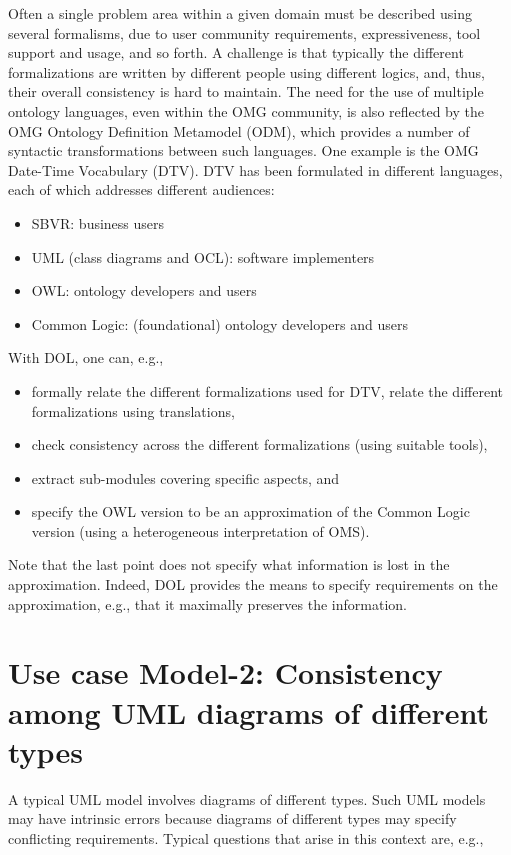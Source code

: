 \documentclass[10pt,%
\ifpretendfinal
final%
\else
draft%
\fi,
]{scrreprt}
\begin{document}
Often a single problem area within a given domain must be described using several formalisms, due to user community requirements, expressiveness, tool support 
and usage, and so forth. A challenge is that typically the different formalizations are written by different people using different logics, and, thus, their overall 
consistency is hard to maintain.
The need for the use of multiple ontology languages, even within the OMG community, is also reflected by the OMG Ontology Definition Metamodel (ODM), which 
provides a number of syntactic transformations between such languages.
One example is the OMG Date-Time Vocabulary (DTV). DTV has been formulated in different languages, each of which addresses different audiences:
\begin{itemize}
\item	 SBVR: business users
\item 	UML (class diagrams and OCL): software implementers
\item 	OWL: ontology developers and users
\item 	Common Logic: (foundational) ontology developers and users
\end{itemize}
With DOL, one can, e.g.,
\begin{itemize}
\item 	formally relate the different formalizations used for DTV, relate the different formalizations using translations,
\item 	check consistency across the different formalizations (using suitable tools),
\item 	extract sub-modules covering specific aspects, and
\item 	specify the OWL version to be an approximation of the Common Logic version (using a heterogeneous interpretation of OMS).
\end{itemize}
Note that the last point does not specify what information is lost in the approximation. Indeed, DOL provides the means to specify requirements on the approximation, e.g., that it maximally preserves the information. 

\section{Use case Model-2: Consistency among UML diagrams of different types}

A typical UML model involves diagrams of different types. Such UML models may have intrinsic errors because diagrams of different types may specify conflicting 
requirements. Typical questions that arise in this context are, e.g.,
\end{document}
